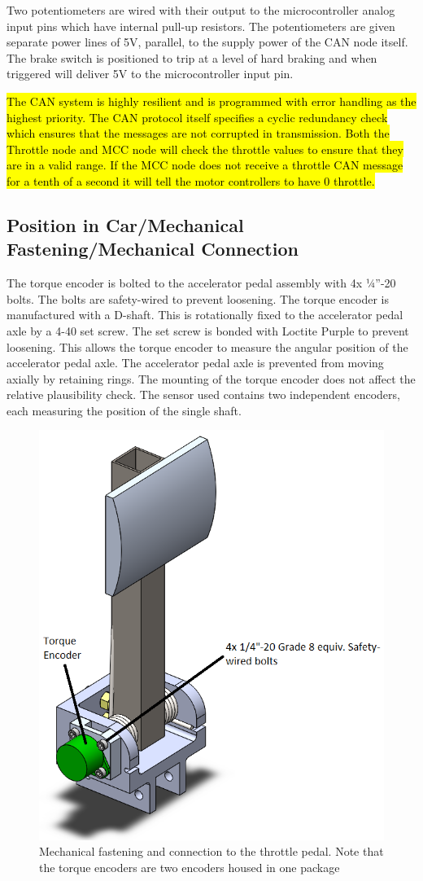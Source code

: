 \documentclass{article}
\DeclareRobustCommand{\hlr}[1]{{\sethlcolor{red}\hl{#1}}}
\begin{document}
        Two potentiometers are wired with their output to the microcontroller analog input pins which have internal pull-up resistors. The potentiometers are given separate power lines of 5V, parallel, to the supply power of the CAN node itself. The brake switch is positioned to trip at a level of hard braking and when triggered will deliver 5V to the microcontroller input pin.

        \hlr{The CAN system is highly resilient and is programmed with error handling as the highest priority. The CAN protocol itself specifies a cyclic redundancy check which ensures that the messages are not corrupted in transmission. Both the Throttle node and MCC node will check the throttle values to ensure that they are in a valid range. If the MCC node does not receive a throttle CAN message for a tenth of a second it will tell the motor controllers to have 0 throttle.}

    \subsection{Position in Car/Mechanical Fastening/Mechanical Connection}


        The torque encoder is bolted to the accelerator pedal assembly with 4x ¼”-20 bolts. The bolts are safety-wired to prevent loosening. The torque encoder is manufactured with a D-shaft. This is rotationally fixed to the accelerator pedal axle by a 4-40 set screw. The set screw is bonded with Loctite Purple to prevent loosening. This allows the torque encoder to measure the angular position of the accelerator pedal axle. The accelerator pedal axle is prevented from moving axially by retaining rings. The mounting of the torque encoder does not affect the relative plausibility check. The sensor used contains two independent encoders, each measuring the position of the single shaft.

        \begin{figure}[H]
            \centering
            \includegraphics[width = 0.5 \textwidth]{torqueencoder}
            \caption{Mechanical fastening and connection to the throttle pedal. Note that the torque encoders are two encoders housed in one package}
            \label{torquefront}
        \end{figure}
\end{document}
